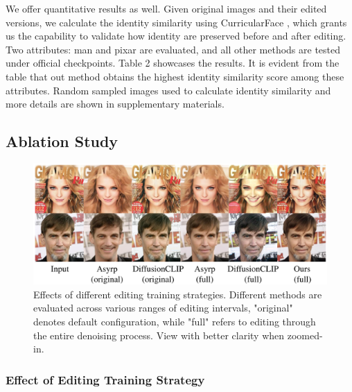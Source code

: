 \documentclass[letterpaper]{article} %
\begin{document}
We offer quantitative results as well. Given original images and their edited versions, we calculate the identity similarity using CurricularFace \cite{huang2020curricularface}, which grants us the capability to validate how identity are preserved before and after editing. Two attributes: man and pixar are evaluated, and all other methods are tested under official checkpoints. Table 2 showcases the results. It is evident from the table that out method obtains the highest identity similarity score among these attributes. Random sampled images used to calculate identity similarity and more details are shown in supplementary materials.


\subsection{Ablation Study}

\begin{figure}[t]
    \centering
    \includegraphics[width=1\columnwidth]{Figs/fig6.pdf}
    \caption{Effects of different editing training strategies. Different methods are evaluated across various ranges of editing intervals, "original" denotes default configuration, while "full" refers to editing through the entire denoising process. View with better clarity when zoomed-in.}
    \label{fig6}
\end{figure}

\subsubsection{Effect of Editing Training Strategy}
\end{document}
